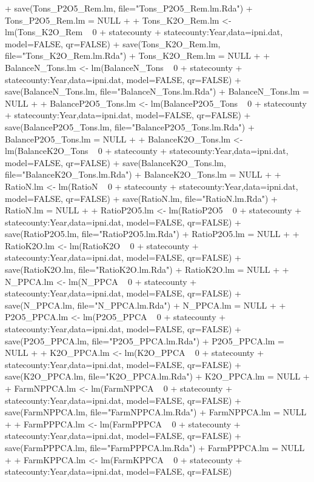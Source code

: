 \documentclass{report}
\begin{document}
\begin{Schunk}
\begin{Sinput}
{+      save(Tons_P2O5_Rem.lm, file="Tons_P2O5_Rem.lm.Rda")
+      Tons_P2O5_Rem.lm = NULL
+      
+      Tons_K2O_Rem.lm <- lm(Tons_K2O_Rem ~ 0 + statecounty + statecounty:Year,data=ipni.dat, model=FALSE, qr=FALSE)
+      save(Tons_K2O_Rem.lm, file="Tons_K2O_Rem.lm.Rda")
+      Tons_K2O_Rem.lm = NULL
+      
+      BalanceN_Tons.lm <- lm(BalanceN_Tons ~ 0 + statecounty + statecounty:Year,data=ipni.dat, model=FALSE, qr=FALSE)
+      save(BalanceN_Tons.lm, file="BalanceN_Tons.lm.Rda")
+      BalanceN_Tons.lm = NULL
+      
+      BalanceP2O5_Tons.lm <- lm(BalanceP2O5_Tons ~ 0 + statecounty + statecounty:Year,data=ipni.dat, model=FALSE, qr=FALSE)
+      save(BalanceP2O5_Tons.lm, file="BalanceP2O5_Tons.lm.Rda")
+      BalanceP2O5_Tons.lm = NULL
+      
+      BalanceK2O_Tons.lm <- lm(BalanceK2O_Tons ~ 0 + statecounty + statecounty:Year,data=ipni.dat, model=FALSE, qr=FALSE)
+      save(BalanceK2O_Tons.lm, file="BalanceK2O_Tons.lm.Rda")
+      BalanceK2O_Tons.lm = NULL
+      
+      RatioN.lm <- lm(RatioN ~ 0 + statecounty + statecounty:Year,data=ipni.dat, model=FALSE, qr=FALSE)
+      save(RatioN.lm, file="RatioN.lm.Rda")
+      RatioN.lm = NULL
+      
+      RatioP2O5.lm <- lm(RatioP2O5 ~ 0 + statecounty + statecounty:Year,data=ipni.dat, model=FALSE, qr=FALSE)
+      save(RatioP2O5.lm, file="RatioP2O5.lm.Rda")
+      RatioP2O5.lm = NULL
+      
+      RatioK2O.lm <- lm(RatioK2O ~ 0 + statecounty + statecounty:Year,data=ipni.dat, model=FALSE, qr=FALSE)
+      save(RatioK2O.lm, file="RatioK2O.lm.Rda")
+      RatioK2O.lm = NULL
+      
+      N_PPCA.lm <- lm(N_PPCA ~ 0 + statecounty + statecounty:Year,data=ipni.dat, model=FALSE, qr=FALSE)
+      save(N_PPCA.lm, file="N_PPCA.lm.Rda")
+      N_PPCA.lm = NULL
+      
+      P2O5_PPCA.lm <- lm(P2O5_PPCA ~ 0 + statecounty + statecounty:Year,data=ipni.dat, model=FALSE, qr=FALSE)
+      save(P2O5_PPCA.lm, file="P2O5_PPCA.lm.Rda")
+      P2O5_PPCA.lm = NULL
+      
+      K2O_PPCA.lm <- lm(K2O_PPCA ~ 0 + statecounty + statecounty:Year,data=ipni.dat, model=FALSE, qr=FALSE)
+      save(K2O_PPCA.lm, file="K2O_PPCA.lm.Rda")
+      K2O_PPCA.lm = NULL
+      
+      FarmNPPCA.lm <- lm(FarmNPPCA ~ 0 + statecounty + statecounty:Year,data=ipni.dat, model=FALSE, qr=FALSE)
+      save(FarmNPPCA.lm, file="FarmNPPCA.lm.Rda")
+      FarmNPPCA.lm = NULL
+      
+      FarmPPPCA.lm <- lm(FarmPPPCA ~ 0 + statecounty + statecounty:Year,data=ipni.dat, model=FALSE, qr=FALSE)
+      save(FarmPPPCA.lm, file="FarmPPPCA.lm.Rda")
+      FarmPPPCA.lm = NULL
+      
+      FarmKPPCA.lm <- lm(FarmKPPCA ~ 0 + statecounty + statecounty:Year,data=ipni.dat, model=FALSE, qr=FALSE)
}
\end{Sinput}
\end{Schunk}
\end{document}
